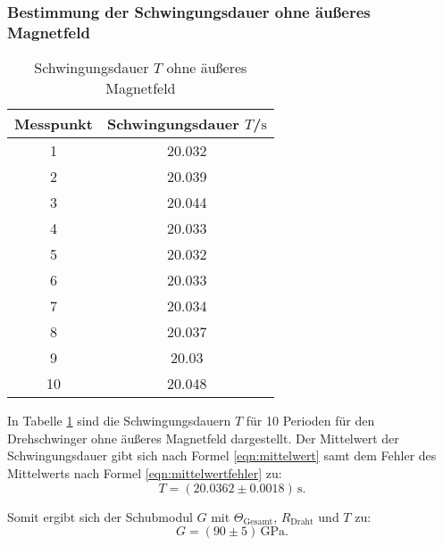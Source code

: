 \subsubsection{Bestimmung der Schwingungsdauer ohne äußeres Magnetfeld}
\begin{table}
	\centering
	\caption{Schwingungsdauer $T$ ohne äußeres Magnetfeld}
	\label{tab:schwingung_ohne}
	\begin{tabular}{cc}

		\toprule
		Messpunkt & Schwingungsdauer $T$/$\si{\second}$ \\
		\midrule
		1         & 20.032                              \\
		2         & 20.039                              \\
		3         & 20.044                              \\
		4         & 20.033                              \\
		5         & 20.032                              \\
		6         & 20.033                              \\
		7         & 20.034                              \\
		8         & 20.037                              \\
		9         & 20.03                               \\
		10        & 20.048                              \\
		\bottomrule
	\end{tabular}
\end{table}
In Tabelle \ref{tab:schwingung_ohne} sind die Schwingungsdauern $T$ für 10 Perioden für den Drehschwinger ohne äußeres Magnetfeld dargestellt.
Der Mittelwert der Schwingungsdauer gibt sich nach Formel \eqref{eqn:mittelwert} samt dem Fehler des Mittelwerts nach Formel \eqref{eqn:mittelwertfehler} zu:
\begin{equation*}
	T= (20.0362 \pm0.0018) \,\si{\second} \text{.}
\end{equation*}


Somit ergibt sich der Schubmodul $G$ mit $\Theta_{\mathrm{Gesamt}}$, $R_{\mathrm{Draht}}$ und $T$ zu:
\begin{equation*}
	G= (90 \pm 5) \,\si{\giga\pascal} \text{.}
\end{equation*}
\FloatBarrier

